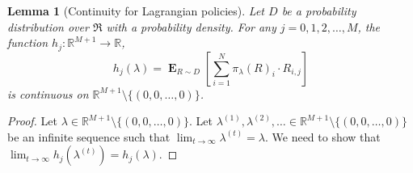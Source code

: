 \documentclass[12pt]{article}
\newcommand{\R}{\mathbb{R}}
\newcommand{\Requests}{\mathfrak{R}}
\DeclareMathOperator*{\Exp}{\mathbf{E}}
\newtheorem{lemma}[theorem]{Lemma}
\theoremstyle{definition}
\begin{document}
\begin{lemma}[Continuity for Lagrangian policies]
\label{lemma:continuity-for-lagrangian-policies}
Let $D$ be a probability distribution over $\Requests$ with a probability
density. For any $j=0,1,2,\dots,M$, the function $h_j:\R^{M+1} \to \R$,
$$
h_j(\lambda) = \Exp_{R \sim D} \left[ \sum_{i=1}^N \pi_{\lambda}(R)_i \cdot R_{i,j} \right]
$$
is continuous on $\R^{M+1} \setminus \{(0,0,\dots,0)\}$.
\end{lemma}

\begin{proof}
Let $\lambda \in \R^{M+1} \setminus \{(0,0,\dots,0)\}$. Let $\lambda^{(1)},
\lambda^{(2)}, \dots \in \R^{M+1} \setminus \{(0,0,\dots,0)\}$ be an infinite
sequence such that $\lim_{t \to \infty} \lambda^{(t)} = \lambda$. We need
to show that $\lim_{t \to \infty} h_j(\lambda^{(t)}) = h_j(\lambda)$.


\end{proof}
\end{document}
